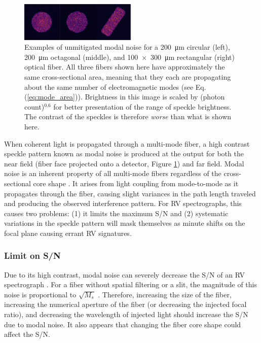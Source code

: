 \documentclass[11pt]{article}
\begin{document}
\begin{figure}
    \begin{center}
	    \includegraphics[width=0.5\textwidth]{images/fiber_example.pdf}
	\end{center}
	\caption{Examples of unmitigated modal noise for a \SI{200}{\micro\meter} circular (left), \SI{200}{\micro\meter} octagonal (middle), and \SI{100x300}{\micro\meter} rectangular (right) optical fiber. All three fibers shown here have approximately the same cross-sectional area, meaning that they each are propagating about the same number of electromagnetic modes (see Eq. (\ref{eq:mode_area})). Brightness in this image is scaled by (photon count)$^{0.6}$ for better presentation of the range of speckle brightness. The contrast of the speckles is therefore \textit{worse} than what is shown here.}
\label{fig:fiber_example}
\end{figure}

When coherent light is propagated through a multi-mode fiber, a high contrast speckle pattern known as modal noise is produced at the output for both the near field (fiber face projected onto a detector, Figure \ref{fig:fiber_example}) and far field. Modal noise is an inherent property of all multi-mode fibers regardless of the cross-sectional core shape \citep{Sablowski2016}. It arises from light coupling from mode-to-mode as it propagates through the fiber, causing slight variances in the path length traveled and producing the observed interference pattern. For RV spectrographs, this causes two problems: (1) it limits the maximum S/N and (2) systematic variations in the speckle pattern will mask themselves as minute shifts on the focal plane causing errant RV signatures.

\subsubsection{Limit on S/N}

Due to its high contrast, modal noise can severely decrease the S/N of an RV spectrograph \citep{Epworth1978, Baudrand2001, Lemke2011, Iuzzolino2014}. For a fiber without spatial filtering or a slit, the magnitude of this noise is proportional to $\sqrt{M_s}$ \citep{Goodman1981}. Therefore, increasing the size of the fiber, increasing the numerical aperture of the fiber (or decreasing the injected focal ratio), and decreasing the wavelength of injected light should increase the S/N due to modal noise. It also appears that changing the fiber core shape could affect the S/N.
\end{document}
